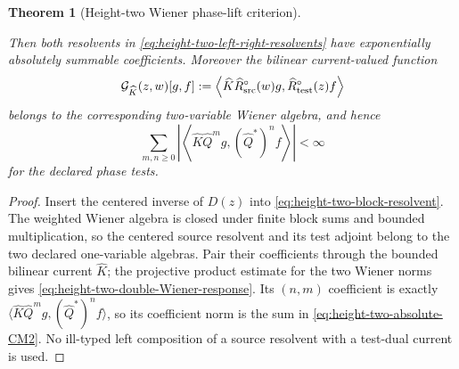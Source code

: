 \documentclass[11pt]{article}
\newtheorem{theorem}{Theorem}[section]
\begin{document}
\begin{theorem}[Height-two Wiener phase-lift criterion]
\begin{enumerate}[label=\textup{(RW\arabic*)}]
\end{enumerate}
Then both resolvents in
\eqref{eq:height-two-left-right-resolvents} have exponentially absolutely
summable coefficients.  Moreover the bilinear current-valued function
\begin{equation}
\label{eq:height-two-double-Wiener-response}
 \mathcal G_{\widehat K}(z,w)[g,f]
 :=\left\langle
  \widehat K\widehat R_{\rm src}^{\circ}(w)g,
  \widehat R_{\rm test}^{\circ}(z)f
 \right\rangle
\end{equation}
belongs to the corresponding two-variable Wiener algebra, and hence
\begin{equation}
\label{eq:height-two-absolute-CM2}
 \sum_{m,n\ge0}
 \left|\left\langle
  \widehat K\widehat Q^mg,(\widehat Q^*)^nf
 \right\rangle\right|<\infty
\end{equation}
for the declared phase tests.
\end{theorem}

\begin{proof}
Insert the centered inverse of $D(z)$ into
\eqref{eq:height-two-block-resolvent}.  The weighted Wiener algebra is closed
under finite block sums and bounded multiplication, so the centered source
resolvent and its test adjoint belong to the two declared one-variable
algebras.  Pair their coefficients through the bounded bilinear current
$\widehat K$; the projective product estimate for the two Wiener norms gives
\eqref{eq:height-two-double-Wiener-response}.  Its $(n,m)$ coefficient is
exactly
$\langle\widehat K\widehat Q^mg,(\widehat Q^*)^nf\rangle$, so its coefficient
norm is the sum in \eqref{eq:height-two-absolute-CM2}.  No ill-typed left
composition of a source resolvent with a test-dual current is used.
\end{proof}
\end{document}
